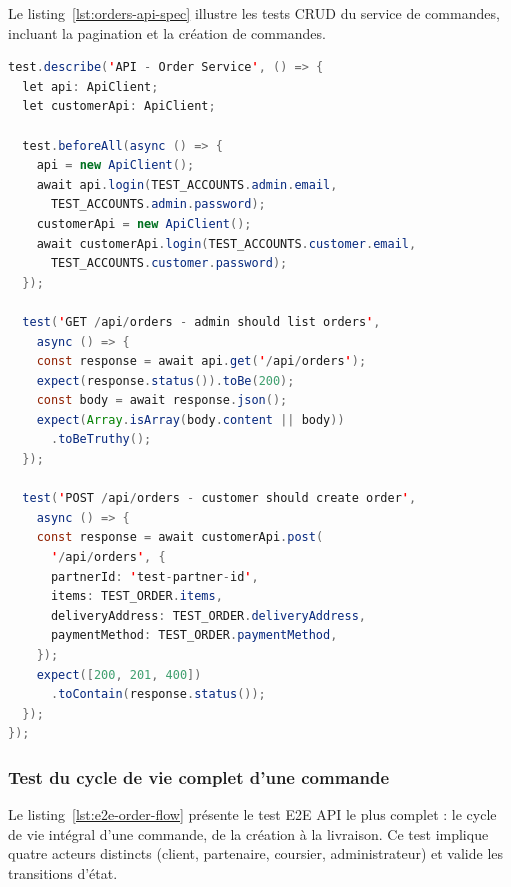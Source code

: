 Le listing~\ref{lst:orders-api-spec} illustre les tests CRUD du service de commandes,
incluant la pagination et la création de commandes.

\begin{lstlisting}[language=Java, caption={Tests API du service de commandes -- orders.api.spec.ts}, label={lst:orders-api-spec}]
test.describe('API - Order Service', () => {
  let api: ApiClient;
  let customerApi: ApiClient;

  test.beforeAll(async () => {
    api = new ApiClient();
    await api.login(TEST_ACCOUNTS.admin.email,
      TEST_ACCOUNTS.admin.password);
    customerApi = new ApiClient();
    await customerApi.login(TEST_ACCOUNTS.customer.email,
      TEST_ACCOUNTS.customer.password);
  });

  test('GET /api/orders - admin should list orders',
    async () => {
    const response = await api.get('/api/orders');
    expect(response.status()).toBe(200);
    const body = await response.json();
    expect(Array.isArray(body.content || body))
      .toBeTruthy();
  });

  test('POST /api/orders - customer should create order',
    async () => {
    const response = await customerApi.post(
      '/api/orders', {
      partnerId: 'test-partner-id',
      items: TEST_ORDER.items,
      deliveryAddress: TEST_ORDER.deliveryAddress,
      paymentMethod: TEST_ORDER.paymentMethod,
    });
    expect([200, 201, 400])
      .toContain(response.status());
  });
});
\end{lstlisting}

\subsubsection{Test du cycle de vie complet d'une commande}

Le listing~\ref{lst:e2e-order-flow} présente le test E2E API le plus complet : le cycle
de vie intégral d'une commande, de la création à la livraison. Ce test implique quatre
acteurs distincts (client, partenaire, coursier, administrateur) et valide les
transitions d'état.

